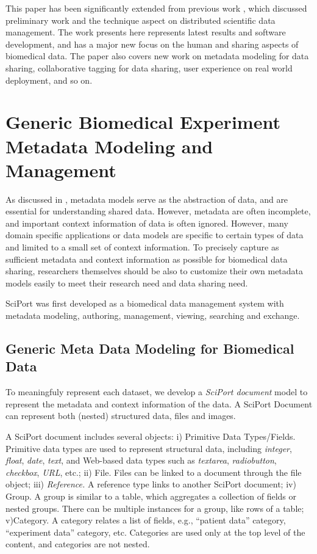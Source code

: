 \documentclass{singlecol-new}
\theoremstyle{TH}{
\newtheorem{lemma}{Lemma}
\newtheorem{theorem}[lemma]{Theorem}
\newtheorem{corrolary}[lemma]{Corrolary}
\newtheorem{conjecture}[lemma]{Conjecture}
\newtheorem{proposition}[lemma]{Proposition}
\newtheorem{claim}[lemma]{Claim}
\newtheorem{stheorem}[lemma]{Wrong Theorem}
\newtheorem{algorithm}{Algorithm}
}
\theoremstyle{THrm}{
\newtheorem{definition}{Definition}[section]
\newtheorem{question}{Question}[section]
\newtheorem{remark}{Remark}
\newtheorem{scheme}{Scheme}
}
\theoremstyle{THhit}{
\newtheorem{case}{Case}[section]
}
\begin{document}
This paper has been significantly extended from previous work
\cite{wang08com}, which discussed preliminary work and the technique
aspect on distributed scientific data management. The work presents
here represents latest results and software development, and has a
major new focus on the human and sharing aspects of biomedical data.
The paper also covers new work on metadata modeling for data
sharing, collaborative tagging for data sharing, user experience on
real world deployment, and so on.



\section{Generic Biomedical Experiment Metadata Modeling and Management} \label{sec:datamanagementoverview}


As discussed in \cite{birnholtz03data}, metadata models serve as the
abstraction of data, and are essential for understanding shared
data. However, metadata  are often incomplete, and important context
information of data \cite{chin04context} is often ignored. However,
many domain specific applications or data models are specific to
certain types of data and limited to a small set of context
information.  To precisely capture as sufficient metadata and
context information as possible for biomedical data sharing,
researchers themselves should be also to customize their own
metadata models easily to meet their research need and data sharing
need.


SciPort was first developed as a biomedical data management system  with
metadata  modeling, authoring, management, viewing, searching and
exchange.


\subsection{Generic Meta Data Modeling for Biomedical Data}

To meaningfuly represent each dataset, we develop a {\em SciPort document} model to represent the metadata and context information of the data.
A SciPort Document can represent both (nested) structured data, files and images.

A SciPort document includes several objects: i) Primitive Data
Types/Fields. Primitive data types are used to represent structural
data, including {\em integer}, {\em float}, {\em date}, {\em text},
and Web-based data types such as {\em textarea}, {\em radiobutton},
{\em checkbox}, {\em URL}, etc.; ii) File. Files can be linked to a
document through the file object; iii) \textit{Reference.}  A
reference type links to another SciPort document; iv) Group. A group
is similar to a table, which aggregates a collection of fields or
nested groups.  There can be multiple instances for a group, like
rows of a table; v)Category. A category relates a list of fields,
e.g., ``patient data'' category, ``experiment data'' category, etc.
Categories are used only at the top level of the content, and
categories are not nested.
\end{document}
